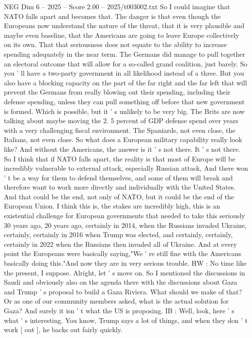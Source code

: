 \begin{textsample}{NEG Dim 6 – 2025 – Score 2.00 – 2025/t003002.txt}
So I could imagine that NATO falls apart and becomes that.
The danger is that even though the Europeans now understand the nature of the threat, that it is very plausible and maybe even baseline, that the Americans are going to leave Europe collectively on its own.
That that seriousness does not equate to the ability to increase spending adequately in the near term.
The Germans did manage to pull together an electoral outcome that will allow for a so-called grand coalition, just barely.
So you ' ll have a two-party government in all likelihood instead of a three.
But you also have a blocking capacity on the part of the far right and the far left that will prevent the Germans from really blowing out their spending, including their defense spending, unless they can pull something off before that new government is formed.
Which is possible, but it ' s unlikely to be very big.
The Brits are now talking about maybe moving the 2. 5 percent of GDP defense spend over years with a very challenging fiscal environment.
The Spaniards, not even close, the Italians, not even close.
So what does a European military capability really look like?
And without the Americans, the answer is it ' s not there.
It ' s not there.
So I think that if NATO falls apart, the reality is that most of Europe will be incredibly vulnerable to external attack, especially Russian attack, And there won ' t be a way for them to defend themselves, and some of them will break and therefore want to work more directly and individually with the United States.
And that could be the end, not only of NATO, but it could be the end of the European Union.
I think this is, the stakes are incredibly high, this is an existential challenge for European governments that needed to take this seriously 30 years ago, 20 years ago, certainly in 2014, when the Russians invaded Ukraine, certainly, certainly in 2016 when Trump was elected, and certainly, certainly, certainly in 2022 when the Russians then invaded all of Ukraine.
And at every point the Europeans were basically saying,"We ' re still fine with the Americans basically doing this."And now they are in very serious trouble.
HW : No time like the present, I suppose.
Alright, let ' s move on.
So I mentioned the discussions in Saudi and obviously also on the agenda there with the discussions about Gaza and Trump ' s proposal to build a Gaza Riviera.
What should we make of that?
Or as one of our community members asked, what is the actual solution for Gaza?
And surely it isn ' t what the US is proposing.
IB : Well, look, here ' s what ' s interesting.
You know, Trump says a lot of things, and when they don ' t work [ out ], he backs out fairly quickly.

\end{textsample}
